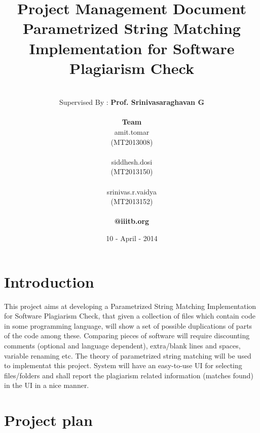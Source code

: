 \documentclass[11pt]{article}
\title{\textbf{Project Management Document\\ Parametrized String Matching Implementation for Software Plagiarism Check}}
\author{
		\vspace{ 2 mm}\\
		Supervised By : \textbf{Prof. Srinivasaraghavan G}\\
		\vspace {2mm}\\
		\textbf{Team} \\	
		amit.tomar \\
		(MT2013008) \\
		\vspace{ -1 mm}\\		
		siddhesh.dosi\\								     
		(MT2013150) \\		
		\vspace{ -1 mm}\\					
		srinivas.r.vaidya\\
		(MT2013152) \\
		\vspace{ -2 mm}\\		
		\textbf{@iiitb.org}}
\date{10 - April - 2014}
\begin{document}
\lstset{language=C} 
\maketitle

\vspace{ 100 mm}

\section{Introduction}

This project aims at developing a Parametrized String Matching Implementation for Software Plagiarism Check, that given a collection of files which contain code in some programming language, will show a set of possible duplications of parts of the code among these. Comparing pieces of software will require discounting comments (optional and language dependent), extra/blank lines and spaces, variable renaming etc. The theory of parametrized string matching will be used to implementat this project. System will have an easy-to-use UI for selecting files/folders and shall report the plagiarism related information (matches found) in the UI in a nice manner.

\section{Project plan}
\end{document}
